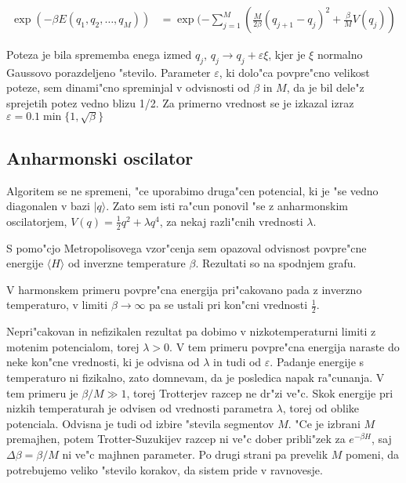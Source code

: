 \documentclass[a4paper,10pt]{article}
\begin{document}
\begin{align}
 \exp\left(-\beta E(q_1, q_2, \ldots, q_M)\right) &= \exp(-\sum_{j=1}^M \left( \frac{M}{2\beta} (q_{j+1} - q_j)^2 + \frac{\beta}{M} V(q_j) \right)
\end{align}

Poteza je bila sprememba enega izmed $q_j$, $q_j \to q_j + \varepsilon \xi$, kjer je $\xi$ normalno Gaussovo porazdeljeno "stevilo. 
Parameter $\varepsilon$, ki dolo"ca povpre"cno velikost poteze, sem dinami"cno spreminjal v odvisnosti od $\beta$ in $M$, da je bil dele"z sprejetih potez vedno blizu 1/2.
Za primerno vrednost se je izkazal izraz $\varepsilon = 0.1 \min\{1, \sqrt{\beta}\}$

\subsection{Anharmonski oscilator}

Algoritem se ne spremeni, "ce uporabimo druga"cen potencial, ki je "se vedno diagonalen v bazi $|q\rangle$. 
Zato sem isti ra"cun ponovil "se z anharmonskim oscilatorjem, $V(q) = \frac{1}{2}q^2 + \lambda q^4$, za nekaj razli"cnih vrednosti $\lambda$. 

S pomo"cjo Metropolisovega vzor"cenja sem opazoval odvisnost povpre"cne energije $\langle H \rangle$ od inverzne temperature $\beta$. 
Rezultati so na spodnjem grafu. 

\begin{figure}[H]
 \centering
 
\end{figure}

V harmonskem primeru povpre"cna energija pri"cakovano pada z inverzno temperaturo, v limiti $\beta \to \infty$ pa se ustali pri kon"cni vrednosti $\frac{1}{2}$. 

Nepri"cakovan in nefizikalen rezultat pa dobimo v nizkotemperaturni limiti z motenim potencialom, torej $\lambda > 0$. 
V tem primeru povpre"cna energija naraste do neke kon"cne vrednosti, ki je odvisna od $\lambda$ in tudi od $\varepsilon$. 
Padanje energije s temperaturo ni fizikalno, zato domnevam, da je posledica napak ra"cunanja. 
V tem primeru je $\beta/M \gg 1$, torej Trotterjev razcep ne dr"zi ve"c. 
Skok energije pri nizkih temperaturah je odvisen od vrednosti parametra $\lambda$, torej od oblike potenciala. 
Odvisna je tudi od izbire "stevila segmentov $M$. 
"Ce je izbrani $M$ premajhen, potem Trotter-Suzukijev razcep ni ve"c dober pribli"zek za $e^{-\beta H}$, saj $\Delta\beta = \beta/M$ ni ve"c majhnen parameter. 
Po drugi strani pa prevelik $M$ pomeni, da potrebujemo veliko "stevilo korakov, da sistem pride v ravnovesje. 
\end{document}
